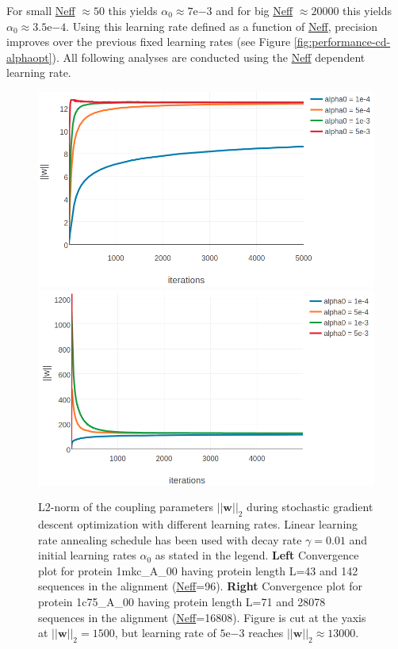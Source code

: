 \documentclass[12pt,a4paper,twoside]{book}
\newcommand{\w}{\mathbf{w}}
\theoremstyle{definition}
\theoremstyle{definition}
\theoremstyle{remark}
\begin{document}
For small \protect\hyperlink{abbrev}{Neff} \(\approx 50\) this yields
\(\alpha_0 \approx 7\mathrm{e}{-3}\) and for big
\protect\hyperlink{abbrev}{Neff} \(\approx 20000\) this yields
\(\alpha_0 \approx 3.5\mathrm{e}{-4}\). Using this learning rate defined
as a function of \protect\hyperlink{bbrev}{Neff}, precision improves
over the previous fixed learning rates (see Figure
\ref{fig:performance-cd-alphaopt}). All following analyses are conducted
using the \protect\hyperlink{abbrev}{Neff} dependent learning rate.














\begin{figure}

{\centering \includegraphics[width=0.5\linewidth]{img/full_likelihood/sgd/parameter_norm_1mkca00_alphas_lindecay001} \includegraphics[width=0.5\linewidth]{img/full_likelihood/sgd/parameter_norm_1c75a00_alphas_lindecay001} 

}

\caption{L2-norm of the
coupling parameters \(||\w||_2\) during stochastic gradient descent
optimization with different learning rates. Linear learning rate
annealing schedule has been used with decay rate \(\gamma=0.01\) and
initial learning rates \(\alpha_0\) as stated in the legend.
\textbf{Left} Convergence plot for protein 1mkc\_A\_00 having protein
length L=43 and 142 sequences in the alignment
(\protect\hyperlink{abbrev}{Neff}=96). \textbf{Right} Convergence plot
for protein 1c75\_A\_00 having protein length L=71 and 28078 sequences
in the alignment (\protect\hyperlink{abbrev}{Neff}=16808). Figure is cut
at the yaxis at \(||\w||_2=1500\), but learning rate of
\(5\mathrm{e}{-3}\) reaches \(||\w||_2 \approx 13000\).}\label{fig:sgd-single-proteins-initial-learning-rate}
\end{figure}
\end{document}
